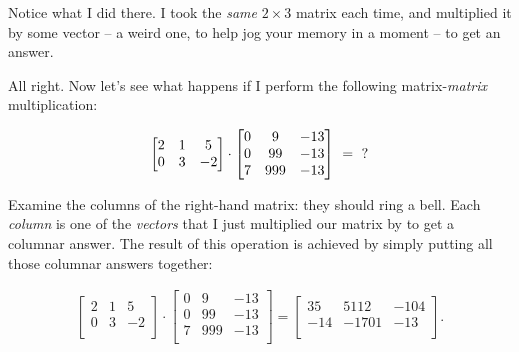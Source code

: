 \smallskip

Notice what I did there. I took the \textit{same} $2\times 3$ matrix each time,
and multiplied it by some vector -- a weird one, to help jog your memory in a
moment -- to get an answer.

All right. Now let's see what happens if I perform the following
matrix-\textit{matrix} multiplication:

\vspace{-.15in}
\begin{align*}
\begin{bmatrix}
2 & 1 & 5 \\
0 & 3 & -2 \\
\end{bmatrix} \cdot
\begin{bmatrix}
0 & 9 & -13 \\
0 & 99 & -13 \\
7 & 999 & -13 \\
\end{bmatrix} \ = \ {\LARGE ?}
\end{align*}
\vspace{-.15in}

Examine the columns of the right-hand matrix: they should ring a bell. Each
\textit{column} is one of the \textit{vectors} that I just multiplied our
matrix by to get a columnar answer. The result of this operation is achieved by
simply putting all those columnar answers together:

\vspace{-.15in}
\begin{align*}
\begin{bmatrix}
2 & 1 & 5 \\
0 & 3 & -2 \\
\end{bmatrix} \cdot
\begin{bmatrix}
0 & 9 & -13 \\
0 & 99 & -13 \\
7 & 999 & -13 \\
\end{bmatrix} =
\begin{bmatrix}
35 & 5112 & -104 \\
-14 & -1701 & -13 \\
\end{bmatrix}.
\end{align*}
\vspace{-.15in}


